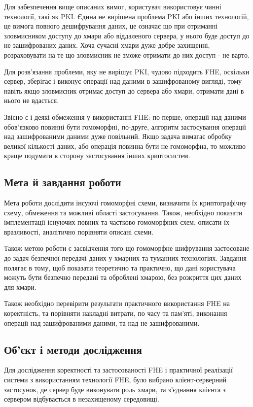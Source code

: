 Для забезпечення вище описаних вимог, користувач використовує чинні технології, такі
як PKI. Єдина не вирішена проблема PKI або інших технологій, це вимога повного
дешифрування даних, це означає що при отриманні зловмисником доступу до хмари або
віддаленого сервера, у нього буде доступ до не зашифрованих даних. Хоча сучасні хмари
дуже добре захищенні, розраховувати на те що зловмисник не зможе отримати до них
доступ - не варто. 

Для розв'язання проблеми, яку не вирішує PKI, чудово підходить FHE, оскільки сервер,
зберігає і виконує операції над даними в зашифрованому вигляді, тому навіть якщо
зловмисник отримає доступ до сервера або хмари, отримати дані в нього не вдасться.

Звісно є і деякі обмеження у використанні FHE: по-перше, операції над даними
обов'язково повинні бути гомоморфні, по-друге, алгоритм застосування операції над
зашифрованими даними дуже повільний. Якщо задача вимагає обробку великої кількості
даних, або операція повинна бути не гомоморфна, то можливо краще подумати в сторону
застосування інших криптосистем.

\subsection*{Мета й завдання роботи}

Мета роботи дослідити інсуючі гомоморфні схеми, визначити їх криптографічну схему, обмеження та
можливі області застосування. Також, необхідно показати імплементації існуючих повних та
частково гомоморфних схем, описати їх вразливості, аналітично порівняти
описані схеми.

Також метою роботи є засвідчення того що гомоморфне шифрування застосоване до задач
безпечної передачі даних у хмарних та туманних технологіях. Завдання полягає в тому,
щоб показати теоретично та практично, що дані користувача можуть бути безпечно передані
та оброблені хмарою, без розкриття цих даних для хмари.

Також необхідно перевірити результати практичного використання FHE на коректність, та порівняти
накладні витрати, по часу та пам'яті, виконання операції над зашифрованими даними, та над не
зашифрованими.

\subsection*{Об’єкт і методи дослідження}
Для дослідження коректності та застосованості FHE і практичної реалізації системи з
використанням технології FHE, було вибрано клієнт-серверний застосунок, де сервер буде
виконувати роль хмари, та з'єднання клієнта з сервером відбувається в незахищеному середовищі.

